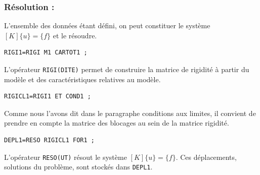 \documentclass[a4paper,multicol]{article}
\begin{document}
\subsubsection*{Résolution :}
 L'ensemble des données étant défini, on peut constituer le système $[K]\{u\} = \{f\}$ et le résoudre.
 \begin{verbatim}
RIGI1=RIGI M1 CARTOT1 ;
\end{verbatim}
L'opérateur {\tt RIGI(DITE)} permet de construire la matrice de rigidité à partir du modèle et des caractéristiques relatives au modèle.
 \begin{verbatim}
RIGICL1=RIGI1 ET COND1 ;
\end{verbatim}

Comme nous l'avons dit dans le paragraphe conditions aux limites, il convient de prendre en compte la matrice des blocages au sein de la matrice rigidité.
 \begin{verbatim}
DEPL1=RESO RIGICL1 FOR1 ;
\end{verbatim}

L'opérateur {\tt RESO(UT)} résout le système $[K]\{u\} = \{f\}$. Ces déplacements, solutions du problème, sont stockés dans {\tt DEPL1}.
\end{document}
